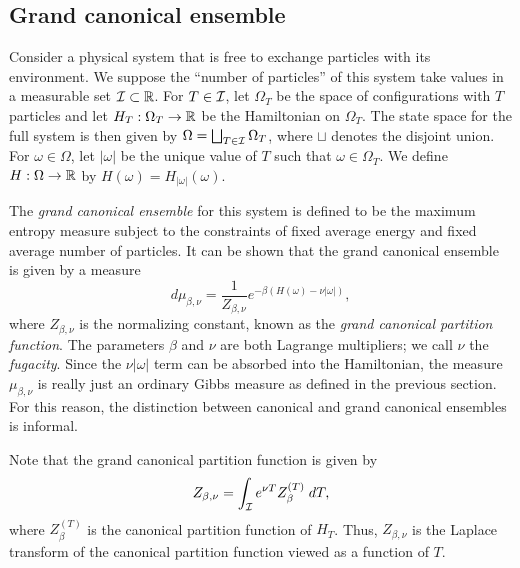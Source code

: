 
\subsection{Grand canonical ensemble}

Consider a physical system that is free to exchange particles with its environment. We suppose
the ``number of particles'' of this system take values in a measurable set $\mathcal{I} \subset {\mathbb R}$.
For $T \in \mathcal{I}$, let $\Omega_T$ be the space of configurations with $T$
particles and let $H_T : \Omega_T \rightarrow {\mathbb R}$ be the Hamiltonian on $\Omega_T$.
The state space for the full system is then given by $\Omega = \bigsqcup_{T \in \mathcal{I}} \Omega_T$,
where $\sqcup$ denotes the disjoint union.
For $\omega\in\Omega$, let $|\omega|$ be the unique value of $T$
such that $\omega \in \Omega_T$.
We define $H : \Omega \rightarrow {\mathbb R}$ by $H(\omega) = H_{|\omega|}(\omega)$.

The \emph{grand canonical ensemble} for this system is defined to be the maximum entropy measure
subject to the constraints of fixed average energy and fixed average number of particles. It can
be shown that the grand canonical ensemble is given by a measure
\begin{equation}
d\mu_{\beta,\nu} = \frac{1}{Z_{\beta,\nu}} e^{-\beta (H(\omega) - \nu |\omega|)},
\end{equation}
where $Z_{\beta,\nu}$ is the normalizing constant, known as the \emph{grand canonical partition
function}. The parameters $\beta$ and $\nu$ are both Lagrange multipliers; we call $\nu$ the
\emph{fugacity}. Since the $\nu |\omega|$ term can be absorbed into the Hamiltonian, the measure
$\mu_{\beta,\nu}$ is really just an ordinary Gibbs measure as defined in the previous section.
For this reason, the distinction between canonical and grand canonical ensembles is informal.

\begin{example}
Note that the grand canonical partition function is given by
\begin{equation}
Z_{\beta,\nu}
  =
\int_{\mathcal{I}} e^{\nu T} Z_\beta^{(T)} \; dT,
\end{equation}
where $Z^{(T)}_\beta$ is the canonical partition function of $H_T$.
Thus, $Z_{\beta,\nu}$ is the Laplace transform of the canonical partition function
viewed as a function of $T$.
\end{example}

